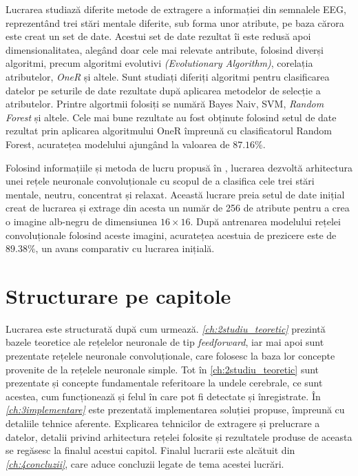 Lucrarea \cite{eeg:2018} studiază diferite metode de extragere a informației din semnalele EEG, reprezentând trei stări mentale diferite, sub forma unor atribute, pe baza cărora este creat un set de date. Acestui set de date rezultat îi este redusă apoi dimensionalitatea, alegând doar cele mai relevate antribute, folosind diverși algoritmi, precum algoritmi evolutivi \textit{(Evolutionary Algorithm)}, corelația atributelor, \textit{OneR} și altele. Sunt studiați diferiți algoritmi pentru clasificarea datelor pe seturile de date rezultate după aplicarea metodelor de selecție a atributelor. Printre algortmii folosiți se numără Bayes Naiv, SVM, \textit{Random Forest} și altele. Cele mai bune rezultate au fost obținute folosind setul de date rezultat prin aplicarea algoritmului OneR împreună cu clasificatorul Random Forest, acuratețea modelului ajungând la valoarea de $87.16\%$.

Folosind informațiile și metoda de lucru propusă în \cite{eeg:2018}, lucrarea \cite{eeg-cnn:2020} dezvoltă arhitectura unei rețele neuronale convoluționale cu scopul de a clasifica cele trei stări mentale, neutru, concentrat și relaxat. Această lucrare preia setul de date inițial creat de lucrarea \cite{eeg:2018} și extrage din acesta un număr de 256 de atribute pentru a crea o imagine alb-negru de dimensiunea $16\times16$. După antrenarea modelului rețelei convoluționale folosind aceste imagini, acuratețea acestuia de prezicere este de $89.38\%$, un avans comparativ cu lucrarea inițială.  

\section{Structurare pe capitole}
Lucrarea este structurată după cum urmează. \textit{\autoref{ch:2studiu_teoretic}} prezintă bazele teoretice ale rețelelor neuronale de tip \textit{feedforward}, iar mai apoi sunt prezentate rețelele neuronale convoluționale, care folosesc la baza lor concepte provenite de la rețelele neuronale simple. Tot în \autoref{ch:2studiu_teoretic} sunt prezentate și concepte fundamentale referitoare la undele cerebrale, ce sunt acestea, cum funcționează și felul în care pot fi detectate și înregistrate. În \textit{\autoref{ch:3implementare}} este prezentată implementarea soluției propuse, împreună cu detaliile tehnice aferente. Explicarea tehnicilor de extragere și prelucrare a datelor, detalii privind arhitectura rețelei folosite și rezultatele produse de aceasta se regăsesc la finalul acestui capitol. Finalul lucrarii este alcătuit din \textit{\autoref{ch:4concluzii}}, care aduce concluzii legate de tema acestei lucrări.